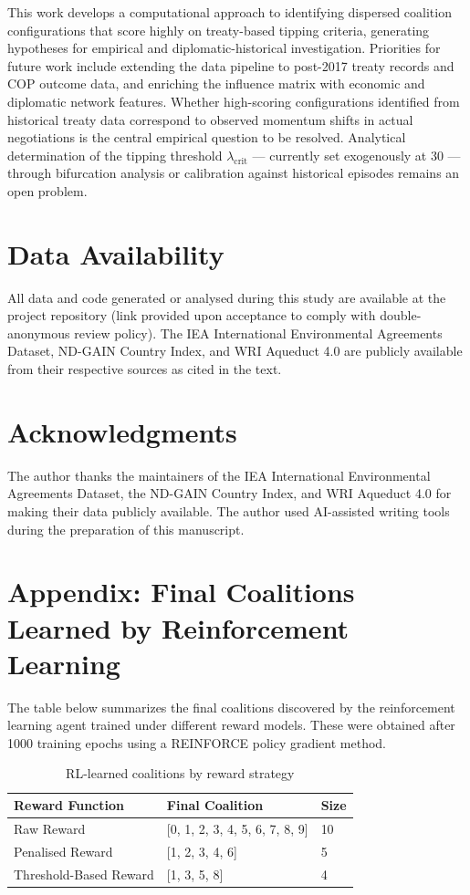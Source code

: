\documentclass[11pt]{article}
\begin{document}
This work develops a computational approach to identifying dispersed coalition configurations that score highly on treaty-based tipping criteria, generating hypotheses for empirical and diplomatic-historical investigation. Priorities for future work include extending the data pipeline to post-2017 treaty records and COP outcome data, and enriching the influence matrix with economic and diplomatic network features. Whether high-scoring configurations identified from historical treaty data correspond to observed momentum shifts in actual negotiations is the central empirical question to be resolved. Analytical determination of the tipping threshold $\lambda_{\text{crit}}$ --- currently set exogenously at 30 --- through bifurcation analysis or calibration against historical episodes remains an open problem.

\section*{Data Availability}
All data and code generated or analysed during this study are available at the project repository (link provided upon acceptance to comply with double-anonymous review policy). The IEA International Environmental Agreements Dataset, ND-GAIN Country Index, and WRI Aqueduct 4.0 are publicly available from their respective sources as cited in the text.

\section*{Acknowledgments}
The author thanks the maintainers of the IEA International Environmental Agreements Dataset, the ND-GAIN Country Index, and WRI Aqueduct 4.0 for making their data publicly available. The author used AI-assisted writing tools during the preparation of this manuscript.


\appendix

\section*{Appendix: Final Coalitions Learned by Reinforcement Learning}
\label{app:rl_coalitions}

The table below summarizes the final coalitions discovered by the reinforcement learning agent trained under different reward models. These were obtained after 1000 training epochs using a REINFORCE policy gradient method.

\begin{table}[H]
	\centering
	\caption{RL-learned coalitions by reward strategy}
	\label{tab:rl_coalitions}
	\begin{tabular}{lll}
		\toprule
		\textbf{Reward Function} & \textbf{Final Coalition} & \textbf{Size} \\
		\midrule
		Raw Reward               & [0, 1, 2, 3, 4, 5, 6, 7, 8, 9] & 10 \\
		Penalised Reward         & [1, 2, 3, 4, 6]               & 5 \\
		Threshold-Based Reward   & [1, 3, 5, 8]                  & 4 \\
		\bottomrule
	\end{tabular}
\end{table}
\end{document}
